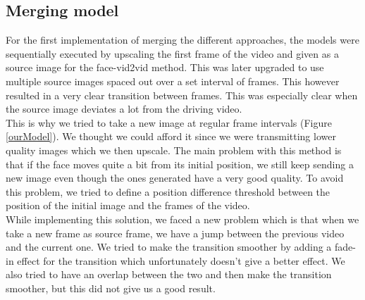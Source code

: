 \documentclass[10pt,twocolumn,letterpaper]{article}
\begin{document}
\subsection{Merging model}
For the first implementation of merging the different approaches, the models were sequentially executed by upscaling the first frame of the video and given as a source image for the face-vid2vid method. This was later upgraded to use multiple source images spaced out over a set interval of frames. This however resulted in a very clear transition between frames. This was especially clear when the source image deviates a lot from the driving video.\\
This is why we tried to take a new image at regular frame intervals (Figure \ref{ourModel}). We thought we could afford it since we were transmitting lower quality images which we then upscale. The main problem with this method is that if the face moves quite a bit from its initial position, we still keep sending a new image even though the ones generated have a very good quality. To avoid this problem, we tried to define a position difference threshold between the position of the initial image and the frames of the video. \\
While implementing this solution, we faced a new problem which is that when we take a new frame as source frame, we have a jump between the previous video and the current one. We tried to make the transition smoother by adding a fade-in effect for the transition which unfortunately doesn't give a better effect. We also tried to have an overlap between the two and then make the transition smoother, but this did not give us a good result.

\end{document}
